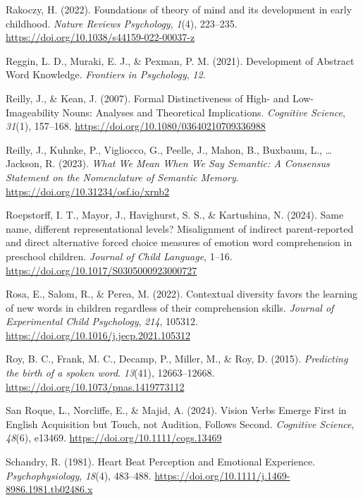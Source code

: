 \documentclass[
  man,floatsintext]{apa6}
\newlength{\cslhangindent}
\newenvironment{CSLReferences}[2] %
 {\begin{list}{}{%
  \setlength{\itemindent}{0pt}
  \setlength{\leftmargin}{0pt}
  \setlength{\parsep}{0pt}
  \ifodd #1
   \setlength{\leftmargin}{\cslhangindent}
   \setlength{\itemindent}{-1\cslhangindent}
  \fi
  \setlength{\itemsep}{#2\baselineskip}}}
 {\end{list}}
\begin{document}
\begin{CSLReferences}{1}{0}
Rakoczy, H. (2022). Foundations of theory of mind and its development in early childhood. \emph{Nature Reviews Psychology}, \emph{1}(4), 223--235. \url{https://doi.org/10.1038/s44159-022-00037-z}

Reggin, L. D., Muraki, E. J., \& Pexman, P. M. (2021). Development of {Abstract Word Knowledge}. \emph{Frontiers in Psychology}, \emph{12}.

Reilly, J., \& Kean, J. (2007). Formal {Distinctiveness} of {High-} and {Low-Imageability Nouns}: {Analyses} and {Theoretical Implications}. \emph{Cognitive Science}, \emph{31}(1), 157--168. \url{https://doi.org/10.1080/03640210709336988}

Reilly, J., Kuhnke, P., Vigliocco, G., Peelle, J., Mahon, B., Buxbaum, L., \ldots{} Jackson, R. (2023). \emph{What {We Mean When We Say Semantic}: {A Consensus Statement} on the {Nomenclature} of {Semantic Memory}}. \url{https://doi.org/10.31234/osf.io/xrnb2}

Roepstorff, I. T., Mayor, J., Havighurst, S. S., \& Kartushina, N. (2024). Same name, different representational levels? {Misalignment} of indirect parent-reported and direct alternative forced choice measures of emotion word comprehension in preschool children. \emph{Journal of Child Language}, 1--16. \url{https://doi.org/10.1017/S0305000923000727}

Rosa, E., Salom, R., \& Perea, M. (2022). Contextual diversity favors the learning of new words in children regardless of their comprehension skills. \emph{Journal of Experimental Child Psychology}, \emph{214}, 105312. \url{https://doi.org/10.1016/j.jecp.2021.105312}

Roy, B. C., Frank, M. C., Decamp, P., Miller, M., \& Roy, D. (2015). \emph{Predicting the birth of a spoken word}. \emph{13}(41), 12663--12668. \url{https://doi.org/10.1073/pnas.1419773112}

San Roque, L., Norcliffe, E., \& Majid, A. (2024). Vision {Verbs Emerge First} in {English Acquisition} but {Touch}, not {Audition}, {Follows Second}. \emph{Cognitive Science}, \emph{48}(6), e13469. \url{https://doi.org/10.1111/cogs.13469}

Schandry, R. (1981). Heart {Beat Perception} and {Emotional Experience}. \emph{Psychophysiology}, \emph{18}(4), 483--488. \url{https://doi.org/10.1111/j.1469-8986.1981.tb02486.x}


\end{CSLReferences}
\end{document}
